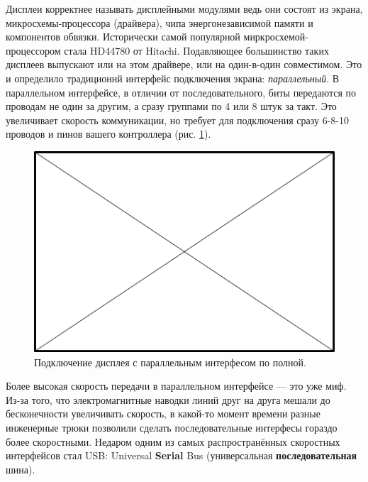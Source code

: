 Дисплеи корректнее называть дисплейными модулями ведь они состоят из экрана, микросхемы-процессора (драйвера), чипа энергонезависимой памяти и компонентов обвязки. Исторически самой популярной миркросхемой-процессором стала HD44780 от Hitachi. Подавляющее большинство таких дисплеев выпускают или на этом драйвере, или на один-в-один совместимом. Это и определило традиционнй интерфейс подключения экрана: \emph{параллельный}. В параллельном интерфейсе, в отличии от последовательного, биты передаются по проводам не один за другим, а сразу группами по 4 или 8 штук за такт. Это увеличивает скорость коммуникации, но требует для подключения сразу 6-8-10 проводов и пинов вашего контроллера (рис. \ref{fig:text-lcd-parallel-8}).

\begin{figure}
  \centering
  \includegraphics{TODO}
  \caption{Подключение дисплея с параллельным интерфесом по полной.}
  \label{fig:text-lcd-parallel-8}
\end{figure}

\begin{Note}
  Более высокая скорость передачи в параллельном интерфейсе — это уже миф. Из-за того, что электромагнитные наводки линий друг на друга мешали до бесконечности увеличивать скорость, в какой-то момент времени разные инженерные трюки позволили сделать последовательные интерфесы гораздо более скоростными. Недаром одним из самых распространённых скоростных интерфейсов стал USB: Universal \textbf{Serial} Bus (универсальная \textbf{последовательная} шина).
\end{Note}

